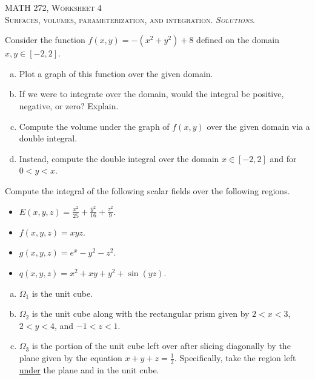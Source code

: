 \documentclass[12pt]{article} %
\begin{document}
\begin{center}
   \textsc{\large MATH 272, Worksheet 4}\\
   \textsc{Surfaces, volumes, parameterization, and integration. \emph{Solutions}.}
\end{center}
\vspace{.5cm}

\begin{problem}
Consider the function $f(x,y)=-(x^2+y^2)+8$ defined on the domain $x,y \in [-2,2]$. 
\begin{enumerate}[(a)]
    \item Plot a graph of this function over the given domain.
    \item If we were to integrate over the domain, would the integral be positive, negative, or zero? Explain.
    \item Compute the volume under the graph of $f(x,y)$ over the given domain via a double integral.
    \item Instead, compute the double integral over the domain $x\in [-2,2]$ and for $0<y<x$. 
\end{enumerate}
\end{problem}
\begin{solution}

\end{solution}

\newpage


\begin{problem}
    Compute the integral of the following scalar fields over the following regions.
\begin{itemize}
    \item $E(x,y,z) = \frac{x^2}{25} + \frac{y^2}{16} + \frac{z^2}{9}$.
    \item $f(x,y,z) = xyz$.
    \item $g(x,y,z) = e^x-y^2-z^2$.
    \item $q(x,y,z) = x^2+xy+y^2+\sin(yz)$.
\end{itemize}
  \begin{multicols}{2}
  \begin{enumerate}[(a)]
      \item $\Omega_1$ is the unit cube.
      \item $\Omega_2$ is the unit cube along with the rectangular prism given by $2<x<3$, $2<y<4$, and $-1<z<1$.
      \item $\Omega_3$ is the portion of the unit cube left over after slicing diagonally by the plane given by the equation $x+y+z=\frac{1}{2}$. Specifically, take the region left \underline{under} the plane and in the unit cube.
  \end{enumerate}
  \end{multicols}  
\end{problem}
\begin{solution}

\end{solution}
\end{document}
